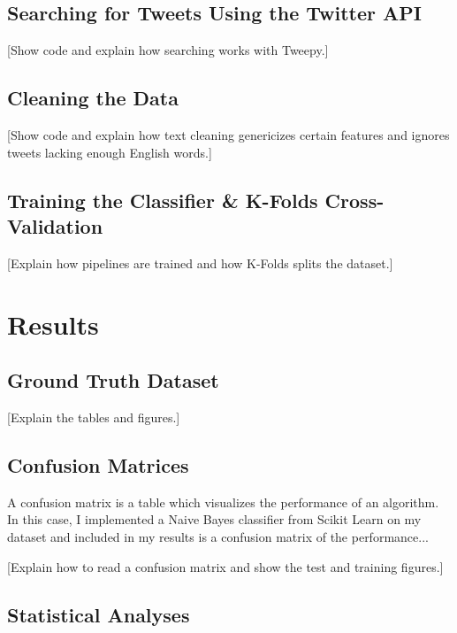\documentclass[11pt, twoside, reqno]{book}
\begin{document}
\section{Searching for Tweets Using the Twitter API}
\label{searching_with_api}

[Show code and explain how searching works with Tweepy.]

\section{Cleaning the Data}
\label{cleaning_data}

[Show code and explain how text cleaning genericizes certain features and ignores tweets lacking enough English words.]

\section{Training the Classifier \& K-Folds Cross-Validation}
\label{training_and_k_folds}

[Explain how pipelines are trained and how K-Folds splits the dataset.]

\chapter{Results}
\label{results}

\section{Ground Truth Dataset}
\label{ground_truth_dataset}

[Explain the tables and figures.]

\section{Confusion Matrices}
\label{confusion_matrices}

A confusion matrix is a table which visualizes the performance of an algorithm. In this case, I implemented a Naive Bayes classifier from Scikit Learn on my dataset and included in my results is a confusion matrix of the performance...

[Explain how to read a confusion matrix and show the test and training figures.]

\section{Statistical Analyses}
\label{statistical_analyses}
\end{document}
